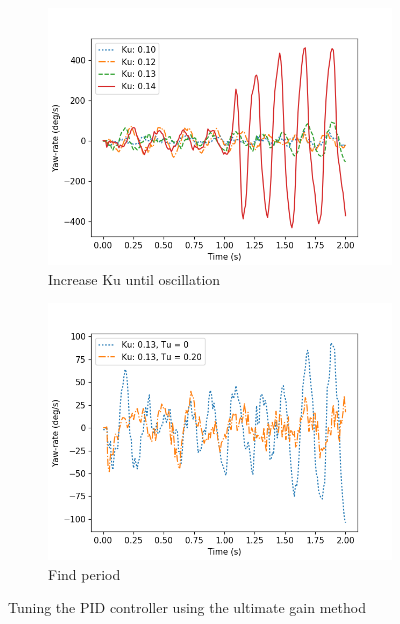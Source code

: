 
\begin{figure}
	\begin{subfigure}[b]{0.49\textwidth}
		\includegraphics[width=\textwidth]{pics/straight_ku.png}
		\caption{Increase Ku until oscillation}
		\label{fig:ultimate_gain}
	\end{subfigure}
	\begin{subfigure}[b]{0.49\textwidth}
		\includegraphics[width=\textwidth]{pics/straight_ku_with_tu.png}
		\caption{Find period}
		\label{fig:gain_tuning}
	\end{subfigure}
	\caption{Tuning the PID controller using the ultimate gain method}
\end{figure}

